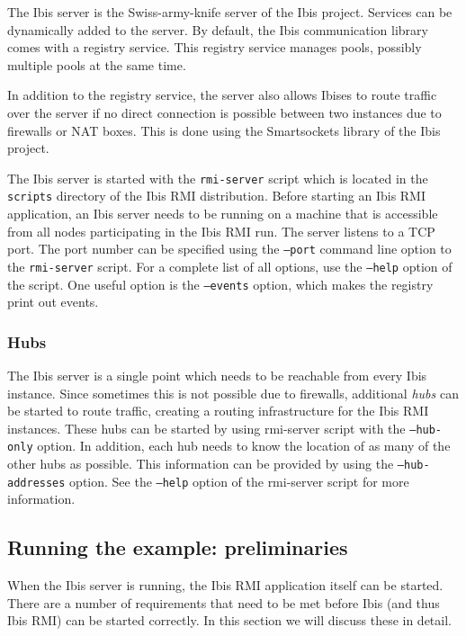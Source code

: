 \documentclass[a4paper,10pt]{article}
\begin{document}
The Ibis server is the Swiss-army-knife server of the Ibis project.
Services can be dynamically added to the server. By default, the Ibis
communication library comes with a registry service. This registry
service manages pools, possibly multiple pools at the same time.

In addition to the registry service, the server also allows
Ibises to route traffic over the server if no direct connection is
possible between two instances due to firewalls or NAT boxes. This is
done using the Smartsockets library of the Ibis project.

The Ibis server is started with the \texttt{rmi-server} script which is
located in the \texttt{scripts} directory of the Ibis RMI distribution.  Before
starting an Ibis RMI application, an Ibis server needs to be running on a
machine that is accessible from all nodes participating in the Ibis RMI run.
The server listens to a TCP port. The port number can be specified using
the \texttt{--port} command line option to the \texttt{rmi-server}
script.  For a complete list of all options, use the \texttt{--help}
option of the script. One useful option is the  \texttt{--events}
option, which makes the registry print out events.

\subsubsection{Hubs}
\label{hubs}

The Ibis server is a single point which needs to be reachable from every
Ibis instance. Since sometimes this is not possible due to firewalls,
additional \emph{hubs} can be started to route traffic, creating a
routing infrastructure for the Ibis RMI instances. These hubs can be started
by using rmi-server script with the \texttt{--hub-only} option. In
addition, each hub needs to know the location of as many of the other
hubs as possible. This information can be provided by using the
\texttt{--hub-addresses} option. See the \texttt{--help} option of the
rmi-server script for more information.

\subsection{Running the example: preliminaries}

When the Ibis server is running, the Ibis RMI application itself can be
started.  There are a number of requirements that need to be met before
Ibis (and thus Ibis RMI) can be started correctly.
In this section we will discuss these in detail.
\end{document}
